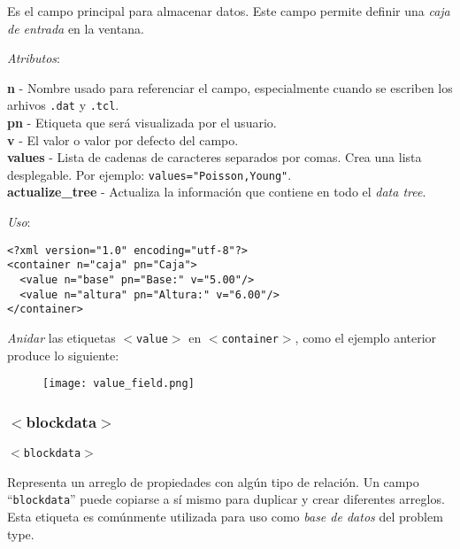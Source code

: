 \documentclass[10pt, a4paper, twocolumn]{article} %
\begin{document}
Es el campo principal para almacenar datos. Este campo permite definir una \textit{caja de entrada} en la ventana.

\vspace{0.15cm}
\textit{Atributos}:

\vspace{0.15cm}
	\textbf{n} - Nombre usado para referenciar el campo, especialmente cuando se escriben los arhivos \texttt{.dat} y \texttt{.tcl}.\\
	\textbf{pn} - Etiqueta que será visualizada por el usuario.\\
	\textbf{v} - El valor o valor por defecto del campo.\\
	\textbf{values} - Lista de cadenas de caracteres separados por comas. Crea una lista desplegable. Por ejemplo: \texttt{values="Poisson,Young"}.\\
	\textbf{actualize\_tree} - Actualiza la información que contiene en todo el \textit{data tree}.
\vspace{0.15cm}

\textit{Uso}:
\vspace{0.15cm}

\lstset{language=XML} 
\begin{lstlisting}[caption={Creación de <value> para almacenar datos.}]
<?xml version="1.0" encoding="utf-8"?>
<container n="caja" pn="Caja">
  <value n="base" pn="Base:" v="5.00"/>
  <value n="altura" pn="Altura:" v="6.00"/>
</container>
\end{lstlisting}

\textit{Anidar} las etiquetas \texttt{$<$value$>$} en \texttt{$<$container$>$}, como el ejemplo anterior produce lo siguiente:

\begin{figure}[hbtp!]
	\centering
	\texttt{[image: value\_field.png]}
\end{figure}


\subsubsection{$<$blockdata$>$}

\vspace{0.20cm}
\begin{center}
	\texttt{$<$blockdata$>$}
\end{center}
\vspace{0.20cm}

Representa un arreglo de propiedades con algún tipo de relación. Un campo ``\texttt{blockdata}'' puede copiarse a sí mismo para duplicar y crear diferentes arreglos. Esta etiqueta es comúnmente utilizada para uso como \textit{base de datos} del problem type.
\end{document}
